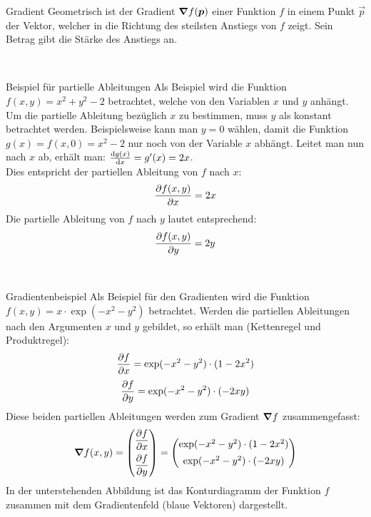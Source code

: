 \begin{appendices}
\begin{defbox}{Gradient}
  Geometrisch ist der Gradient $\bm{\nabla}f(\bm{p})$ einer Funktion $f$ in
  einem Punkt $\vec{p}$ der Vektor, welcher in die Richtung des steilsten
  Anstiegs von $f$ zeigt. Sein Betrag gibt die Stärke des Anstiegs an.
\end{defbox}
\\
\begin{examplebox}{Beispiel für partielle Ableitungen}
  Als Beispiel wird die Funktion $f(x,y) = x^2 + y^2 - 2$ betrachtet, welche von
  den Variablen $x$ und $y$ anhängt.
  Um die partielle Ableitung bezüglich $x$ zu bestimmen, muss $y$ als konstant
  betrachtet werden. Beispielsweise kann man $y=0$ wählen, damit die Funktion
  $g(x) = f(x,0) = x^2 - 2$ nur noch von der Variable $x$ abhängt.
  Leitet man nun nach $x$ ab, erhält man:
  $\frac{\text{d}g(x)}{\text{d}x} = g'(x) = 2x$.\\
  Dies entspricht der partiellen Ableitung von $f$ nach $x$:
  \[ \frac{\partial f(x,y)}{\partial x} = 2x \]
  Die partielle Ableitung von $f$ nach $y$ lautet entsprechend:
  \[ \frac{\partial f(x,y)}{\partial y} = 2y \]
\end{examplebox}
\\
\begin{examplebox}{Gradientenbeispiel}
  Als Beispiel für den Gradienten wird die Funktion $f(x,y) = x \cdot \exp(-x^2 - y^2)$ betrachtet.
  Werden die partiellen Ableitungen nach den Argumenten $x$ und $y$ gebildet,
  so erhält man (Kettenregel und Produktregel):
  \[ \frac{\partial f}{\partial x} = \exp(-x^2 - y^2) \cdot (1-2x^2) \]
  \[ \frac{\partial f}{\partial y} = \exp(-x^2 - y^2) \cdot (-2xy) \]
  Diese beiden partiellen Ableitungen werden zum Gradient $\bm{\nabla} f$ zusammengefasst:
  \[ \bm{\nabla}f(x,y) =
    \begin{pmatrix}
      \displaystyle\frac{\partial f}{\partial x} \\[8pt]
      \displaystyle\frac{\partial f}{\partial y} \\
    \end{pmatrix}
    =
    \begin{pmatrix}
      \exp(-x^2 - y^2) \cdot (1-2x^2) \\[5pt]
      \exp(-x^2 - y^2) \cdot (-2xy) \\
    \end{pmatrix}
 \]
 In der unterstehenden Abbildung ist das Konturdiagramm der Funktion $f$
 zusammen mit dem Gradientenfeld (blaue Vektoren) dargestellt.


\end{examplebox}
\end{appendices}
